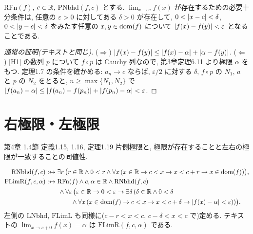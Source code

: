 \begin{thm}
  $\mathrm{RFn}(f)$, $c \in \mathbb{R}$, $\mathrm{PNbhd}(f, c)$ とする. $\lim_{x \to c} f(x)$ が存在するための必要十分条件は, 任意の $\varepsilon > 0$ に対してある $\delta > 0$ が存在して, $0 < \lvert x - c\rvert < \delta$, $0 < \lvert y - c\rvert < \delta$ をみたす任意の $x, y \in \mathrm{dom}(f)$ について $\lvert f(x) - f(y)\rvert < \varepsilon$ となることである.
\end{thm}
\begin{proof}[通常の証明(テキストと同じ)]
  ($\Rightarrow$) $\lvert f(x) - f(y)\rvert \leq \lvert f(x) - \alpha\rvert + \lvert \alpha - f(y)\rvert$. ($\Leftarrow$) [H1] の数列 $p$ について $f \circ p$ は Cauchy 列なので, 第3章定理6.11 より極限 $\alpha$ をもつ. 定理1.7 の条件を確かめる: $a_n \to c$ ならば, $\varepsilon/2$ に対する $\delta$, $f \circ p$ の $N_1$, $a$ と $p$ の $N_2$ をとると, $n \geq \max\{N_1, N_2\}$ で $\lvert f(a_n) - \alpha\rvert \leq \lvert f(a_n) - f(p_n)\rvert + \lvert f(p_n) - \alpha\rvert < \varepsilon$.
\end{proof}

\section{右極限・左極限}

\begin{textref}{第4章 1.4節 定義1.15, 1.16, 定理1.19}
  片側極限と, 極限が存在することと左右の極限が一致することの同値性.
\end{textref}

\begin{dfn}[テキスト定義1.15, 1.16]
  \begin{align*}
    \mathrm{RNbhd}(f, c) &:\leftrightarrow \exists r\,\bigl(r \in \mathbb{R} \land 0 < r \land \forall x\,(x \in \mathbb{R} \to c < x \to x < c + r \to x \in \mathrm{dom}(f))\bigr),\\
    \mathrm{FLimR}(f, c, \alpha) &:\leftrightarrow \mathrm{RFn}(f) \land c, \alpha \in \mathbb{R} \land \mathrm{RNbhd}(f, c) \\
    &\qquad \land \forall\varepsilon\,\bigl(\varepsilon \in \mathbb{R} \to 0 < \varepsilon \to \exists\delta\,(\delta \in \mathbb{R} \land 0 < \delta \\
    &\qquad\qquad \land \forall x\,(x \in \mathrm{dom}(f) \to c < x \to x < c + \delta \to \lvert f(x) - \alpha\rvert < \varepsilon))\bigr).
  \end{align*}
  左側の $\mathrm{LNbhd}$, $\mathrm{FLimL}$ も同様に($c - r < x < c$, $c - \delta < x < c$ で)定める. テキストの $\lim_{x \to c+0} f(x) = \alpha$ は $\mathrm{FLimR}(f, c, \alpha)$ である.
\end{dfn}

